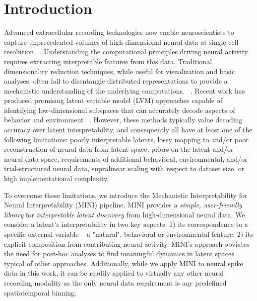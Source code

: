\section{Introduction}

Advanced extracellular recording technologies now enable neuroscientists to capture unprecedented volumes of high-dimensional neural data at single-cell resolution ~\cite{steinmetz_2021_neuropixels2, raducanu_2017_neuroseeker, cai_2016_miniscope, villette_2019_voltage_2p, ouzounov_2017_three_photon, ahrens_2013_lightsheet}. Understanding the computational principles driving neural activity requires extracting interpretable features from this data. Traditional dimensionality reduction techniques, while useful for visualization and basic analyses, often fail to disentangle distributed representations to provide a mechanistic understanding of the underlying computations. ~\cite{cunningham_2014_neural_dr, humphries_2021_dr_principles, hotelling_1933_pca, hoyer_2004_sparsenmf}. Recent work has produced promising latent variable model (LVM) approaches capable of identifying low-dimensional subspaces that can accurately decode aspects of behavior and environment ~\cite{song_2025_langevinflow, schneider_2023_cebra, le_2022_stndt, keshtkaran_2022_autolfads, yu_2009_gpfa, macke_2011_plds, gao_2016_pflds, low_2018_mind, jensen_2020_mgplvm, hernandez_2020_vind, kim_2021_plnde, hurwitz_2021_tndm, schimel_2022_ilqrvae, kudryashova_2023_ctrltndm, ye_2023_ndt2, gondur_2024_mmgpvae, pellegrino_2024_slicetca, sani_2024_dpad, pals_2024_smclr_rnn, zhang_2024_mtm, george_2025_simpl, perkins_2025_mint, schmutz_2025_nce}. However, these methods typically value decoding accuracy over latent interpretability, and consequently all have at least one of the following limitations: poorly interpretable latents, lossy mapping to and/or poor reconstruction of neural data from latent space, priors on the latent and/or neural data space, requirements of additional behavioral, environmental, and/or trial-structured neural data, supralinear scaling with respect to dataset size, or high implementational complexity.

To overcome these limitations, we introduce the Mechanistic Interpretability for Neural Interpretability (MINI) pipeline. MINI provides a \textit{simple, user-friendly library} for \textit{interpretable latent discovery} from high-dimensional neural data. We consider a latent's interpretability in two key aspects: 1) its correspondence to a specific external variable -- a "natural", behavioral or environmental feature; 2) its explicit composition from contributing neural activity. MINI's approach obviates the need for post-hoc analyses to find meaningful dynamics in latent spaces typical of other approaches. Additionally, while we apply MINI to neural spike data in this work, it can be readily applied to virtually any other neural recording modality as the only neural data requirement is any predefined spatiotemporal binning.

